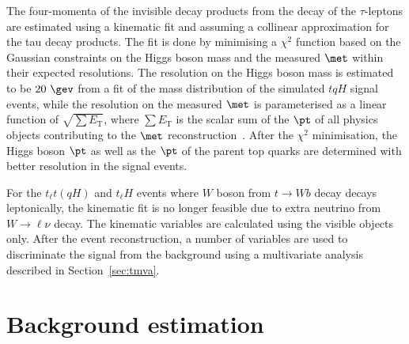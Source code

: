 \documentclass[PAPER, coverpage, atlasdraft=true, texlive=2016, UKenglish]{\ATLASLATEXPATH atlasdoc} %
\begin{document}
The four-momenta of the invisible decay products from the decay of the $\tau$-leptons 
are estimated using a kinematic fit and assuming a collinear approximation for the tau decay products.
The fit is done by minimising a $\chi^2$ function based on the Gaussian constraints on the Higgs boson mass and the
measured $\met$ within their expected resolutions. The resolution on the Higgs boson mass is estimated to be $20~\gev$ from a fit of the mass
distribution of the simulated  $tqH$ signal events, while the resolution on the measured $\met$ is parameterised as a linear function of 
$\sqrt{\sum E_{\text{T}}}$, where $\sum E_{\text{T}}$ is the scalar sum of the $\pt$ of all physics objects contributing to the $\met$ reconstruction~\cite{Aaboud:2018tkc}.
After the $\chi^2$ minimisation, the Higgs boson $\pt$ as well as the 
$\pt$ of the parent top quarks are determined with better resolution in the signal events. 

For the  $t_{\ell}t(qH)$ and $t_{\ell}H$ events where $W$ boson from $t\to W b$ decay decays leptonically,
the kinematic fit is no longer feasible due to extra neutrino from $W\rightarrow \ell\nu$ decay. The kinematic variables are calculated using the visible
objects only. After the event reconstruction, a number of variables are used to discriminate the signal from the background using a multivariate analysis described
in Section~\ref{sec:tmva}.



\FloatBarrier

\section{Background estimation}
\label{sec:background_model}
\end{document}

